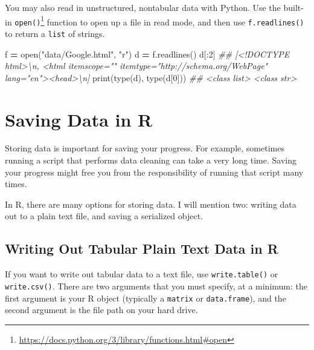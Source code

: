 \documentclass[
  12pt,
  krantz2]{krantz}
\makeatletter
\newenvironment{Shaded}{\begin{snugshade}}{\end{snugshade}}
\newcommand{\BuiltInTok}[1]{#1}
\newcommand{\CommentTok}[1]{\textcolor[rgb]{0.37,0.37,0.37}{\textit{#1}}}
\newcommand{\DecValTok}[1]{\textcolor[rgb]{0.06,0.06,0.06}{#1}}
\newcommand{\NormalTok}[1]{#1}
\newcommand{\OperatorTok}[1]{\textcolor[rgb]{0.43,0.43,0.43}{\textbf{#1}}}
\newcommand{\StringTok}[1]{\textcolor[rgb]{0.5,0.5,0.5}{#1}}
\renewcommand{\href}[2]{#2\footnote{\url{#1}}}
\newenvironment{kframe}{%
\medskip{}
\setlength{\fboxsep}{.8em}
 \def\at@end@of@kframe{}%
 \ifinner\ifhmode%
  \def\at@end@of@kframe{\end{minipage}}%
  \begin{minipage}{\columnwidth}%
 \fi\fi%
 \def\FrameCommand##1{\hskip\@totalleftmargin \hskip-\fboxsep
 \colorbox{shadecolor}{##1}\hskip-\fboxsep
     \hskip-\linewidth \hskip-\@totalleftmargin \hskip\columnwidth}%
 \MakeFramed {\advance\hsize-\width
   \@totalleftmargin\z@ \linewidth\hsize
   \@setminipage}}%
 {\par\unskip\endMakeFramed%
 \at@end@of@kframe}
\renewenvironment{Shaded}{\begin{kframe}}{\end{kframe}}
\makeatother
\begin{document}
You may also read in unstructured, nontabular data with Python. Use the built-in \href{https://docs.python.org/3/library/functions.html\#open}{\texttt{open()}} function to open up a file in read mode, and then use \texttt{f.readlines()} to return a \texttt{list} of strings.

\begin{Shaded}
\begin{Highlighting}[]
\NormalTok{f }\OperatorTok{=} \BuiltInTok{open}\NormalTok{(}\StringTok{"data/Google.html"}\NormalTok{, }\StringTok{"r"}\NormalTok{)}
\NormalTok{d }\OperatorTok{=}\NormalTok{ f.readlines()}
\NormalTok{d[:}\DecValTok{2}\NormalTok{]}
\CommentTok{\#\# [\textquotesingle{}\textless{}!DOCTYPE html\textgreater{}\textbackslash{}n\textquotesingle{}, \textquotesingle{}\textless{}html itemscope="" itemtype="http://schema.org/WebPage" lang="en"\textgreater{}\textless{}head\textgreater{}\textbackslash{}n\textquotesingle{}]}
\BuiltInTok{print}\NormalTok{(}\BuiltInTok{type}\NormalTok{(d), }\BuiltInTok{type}\NormalTok{(d[}\DecValTok{0}\NormalTok{]))}
\CommentTok{\#\# \textless{}class \textquotesingle{}list\textquotesingle{}\textgreater{} \textless{}class \textquotesingle{}str\textquotesingle{}\textgreater{}}
\end{Highlighting}
\end{Shaded}

\hypertarget{saving-data-in-r}{%
\section{Saving Data in R}\label{saving-data-in-r}}

Storing data is important for saving your progress. For example, sometimes running a script that performs data cleaning can take a very long time. Saving your progress might free you from the responsibility of running that script many times.

In R, there are many options for storing data. I will mention two: writing data out to a plain text file, and saving a serialized object.

\hypertarget{writing-out-tabular-plain-text-data-in-r}{%
\subsection{Writing Out Tabular Plain Text Data in R}\label{writing-out-tabular-plain-text-data-in-r}}

If you want to write out tabular data to a text file, use \texttt{write.table()} or \texttt{write.csv()}. There are two arguments that you must specify, at a minimum: the first argument is your R object (typically a \texttt{matrix} or \texttt{data.frame}), and the second argument is the file path on your hard drive.
\end{document}
